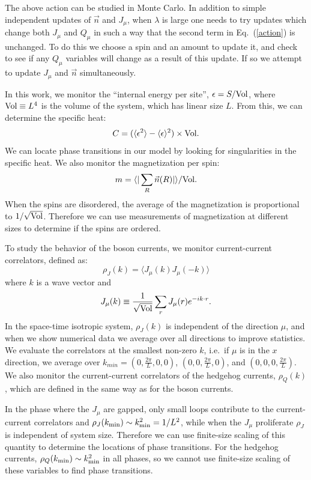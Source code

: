 \documentclass[prb,twocolumn]{revtex4-1}
\def\ra{\rangle} %
\def\la{\langle} %
\begin{document}
The above action can be studied in Monte Carlo. In addition to simple independent updates of $\vec{n}$ and $J_\mu$, when $\lambda$ is large one needs to try updates which change both $J_\mu$ and $Q_\mu$ in such a way that the second term in Eq.~(\ref{action}) is unchanged. To do this we choose a spin and an amount to update it, and check to see if any $Q_\mu$ variables will change as a result of this update. If so we attempt to update $J_\mu$ and $\vec{n}$ simultaneously.

In this work, we monitor the ``internal energy per site'', $\epsilon= S /{\rm Vol}$, where ${\rm Vol}\equiv L^4$ is the volume of the system, which has linear size $L$. From this, we can determine the specific heat:
\begin{equation}
C=(\la \epsilon^2\ra-\la\epsilon\ra^2)\times{\rm Vol}.
\end{equation}
We can locate phase transitions in our model by looking for singularities in the specific heat. We also monitor the magnetization per spin:
\begin{equation}
m=\la |\sum_R \vec{n}(R)|\ra/{\rm Vol}.
\end{equation}
When the spins are disordered, the average of the magnetization is proportional to $1/\sqrt{\rm Vol}$. Therefore we can use measurements of magnetization at different sizes to determine if the spins are ordered.

To study the behavior of the boson currents, we monitor current-current correlators, defined as:
\begin{equation}
\rho_J({k})=\la J_\mu({k})J_\mu(-{k})\ra
\label{rho}
\end{equation}
where $k$ is a wave vector and 
\begin{equation}
J_\mu({k})\equiv\frac{1}{\rm \sqrt{Vol}}\sum_r J_\mu(r)e^{-i{k}\cdot r}.
\end{equation}
In the space-time isotropic system, $\rho_J({k})$ is independent of the direction $\mu$, and when we show numerical data we average over all directions to improve statistics. We evaluate the correlators at the smallest non-zero ${k}$, i.e.~if $\mu$ is in the $x$ direction, we average over ${k}_{min}=(0,\frac{2\pi}{L},0,0)$, $(0,0,\frac{2\pi}{L},0)$, and $(0,0,0,\frac{2\pi}{L})$. We also monitor the current-current correlators of the hedgehog currents, $\rho_Q(k)$, which are defined in the same way as for the boson currents.

In the phase where the $J_\mu$ are gapped, only small loops contribute to the current-current correlators and $\rho_J(k_{\rm min})\sim {k}_{\rm min}^2=1/L^2$, while when the $J_\mu$ proliferate $\rho_J$ is independent of system size. Therefore we can use finite-size scaling of this quantity to determine the locations of phase transitions. For the hedgehog currents, $\rho_Q(k_{\rm min})\sim {k}_{\rm min}^2$ in all phases, so we cannot use finite-size scaling of these variables to find phase transitions. 
\end{document}

